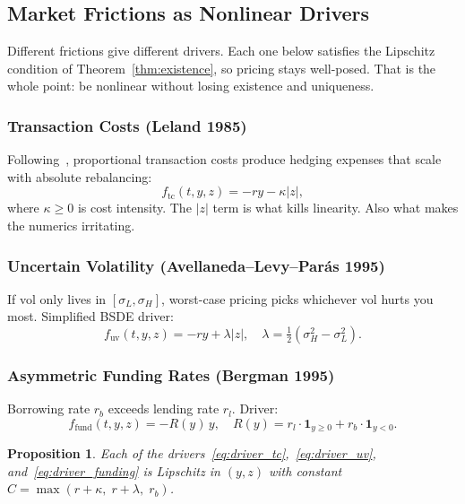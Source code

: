 \documentclass[11pt]{article}
\newtheorem{proposition}[theorem]{Proposition}
\theoremstyle{definition}
\theoremstyle{remark}
\newcommand{\abs}[1]{\lvert #1 \rvert}
\begin{document}
\subsection{Market Frictions as Nonlinear Drivers}\label{sec:drivers}

Different frictions give different drivers. Each one below satisfies the
Lipschitz condition of Theorem~\ref{thm:existence}, so pricing stays
well-posed. That is the whole point: be nonlinear without losing
existence and uniqueness.

\subsubsection{Transaction Costs (Leland 1985)}
Following~\cite{leland1985option}, proportional transaction costs
produce hedging expenses that scale with absolute rebalancing:
\begin{equation}\label{eq:driver_tc}
  f_{\mathrm{tc}}(t, y, z) = -ry - \kappa \abs{z},
\end{equation}
where $\kappa \ge 0$ is cost intensity. The $\abs{z}$ term is what
kills linearity. Also what makes the numerics irritating.

\subsubsection{Uncertain Volatility (Avellaneda--Levy--Par\'{a}s 1995)}
If vol only lives in $[\sigma_L, \sigma_H]$, worst-case pricing picks
whichever vol hurts you most. Simplified BSDE driver:
\begin{equation}\label{eq:driver_uv}
  f_{\mathrm{uv}}(t, y, z) = -ry + \lambda\abs{z},
  \quad \lambda = \tfrac{1}{2}(\sigma_H^2 - \sigma_L^2).
\end{equation}

\subsubsection{Asymmetric Funding Rates (Bergman 1995)}
Borrowing rate $r_b$ exceeds lending rate $r_l$. Driver:
\begin{equation}\label{eq:driver_funding}
  f_{\mathrm{fund}}(t, y, z) = -R(y)\,y,
  \quad R(y) = r_l \cdot \mathbf{1}_{y \ge 0} + r_b \cdot \mathbf{1}_{y < 0}.
\end{equation}

\begin{proposition}\label{prop:lipschitz}
Each of the drivers~\eqref{eq:driver_tc},~\eqref{eq:driver_uv},
and~\eqref{eq:driver_funding} is Lipschitz in $(y,z)$ with constant
$C = \max(r + \kappa,\; r + \lambda,\; r_b)$.
\end{proposition}
\end{document}
